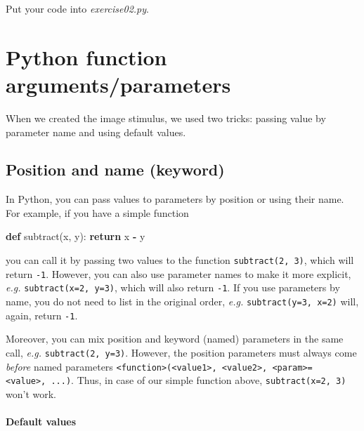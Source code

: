 \documentclass[
]{book}
\newenvironment{Shaded}{\begin{snugshade}}{\end{snugshade}}
\newcommand{\ControlFlowTok}[1]{\textcolor[rgb]{0.13,0.29,0.53}{\textbf{#1}}}
\newcommand{\KeywordTok}[1]{\textcolor[rgb]{0.13,0.29,0.53}{\textbf{#1}}}
\newcommand{\NormalTok}[1]{#1}
\newcommand{\OperatorTok}[1]{\textcolor[rgb]{0.81,0.36,0.00}{\textbf{#1}}}
\begin{document}
Put your code into \emph{exercise02.py}.

\hypertarget{python-function-argumentsparameters}{%
\section{Python function arguments/parameters}\label{python-function-argumentsparameters}}

When we created the image stimulus, we used two tricks: passing value by parameter name and using default values.

\hypertarget{position-and-name-keyword}{%
\subsection{Position and name (keyword)}\label{position-and-name-keyword}}

In Python, you can pass values to parameters by position or using their name. For example, if you have a simple function

\begin{Shaded}
\begin{Highlighting}[]
\KeywordTok{def}\NormalTok{ subtract(x, y):}
    \ControlFlowTok{return}\NormalTok{ x }\OperatorTok{{-}}\NormalTok{ y}
\end{Highlighting}
\end{Shaded}

you can call it by passing two values to the function \texttt{subtract(2,\ 3)}, which will return \texttt{-1}. However, you can also use parameter names to make it more explicit, \emph{e.g.} \texttt{subtract(x=2,\ y=3)}, which will also return \texttt{-1}. If you use parameters by name, you do not need to list in the original order, \emph{e.g.} \texttt{subtract(y=3,\ x=2)} will, again, return \texttt{-1}.

Moreover, you can mix position and keyword (named) parameters in the same call, \emph{e.g.} \texttt{subtract(2,\ y=3)}. However, the position parameters must always come \emph{before} named parameters \texttt{\textless{}function\textgreater{}(\textless{}value1\textgreater{},\ \textless{}value2\textgreater{},\ \textless{}param\textgreater{}=\textless{}value\textgreater{},\ ...)}. Thus, in case of our simple function above, \texttt{subtract(x=2,\ 3)} won't work.

\hypertarget{default-values}{%
\paragraph{Default values}\label{default-values}}
\end{document}
